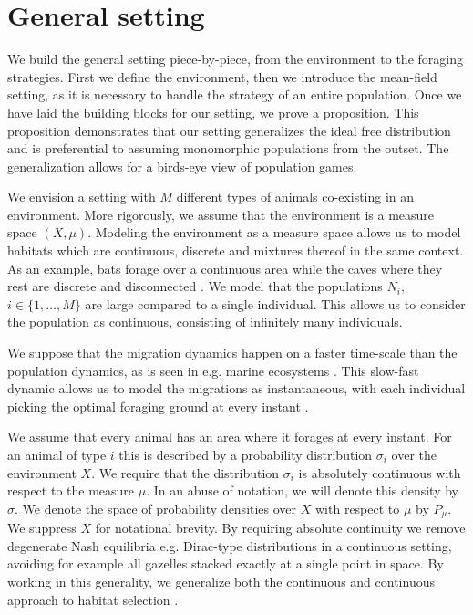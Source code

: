 \section{General setting}
\label{sec:general_setting}
We build the general setting piece-by-piece, from the environment to the foraging strategies. First we define the environment, then we introduce the mean-field setting, as it is necessary to handle the strategy of an entire population. Once we have laid the building blocks for our setting, we prove a proposition. This proposition demonstrates that our setting generalizes the ideal free distribution and is preferential to assuming monomorphic populations from the outset. The generalization allows for a birds-eye view of population games.

We envision a setting with $M$ different types of animals co-existing in an environment.  More rigorously, we assume that the environment is a measure space $(X,\mu)$. Modeling the environment as a measure space allows us to model habitats which are continuous, discrete and mixtures thereof in the same context. As an example, bats forage over a continuous area while the caves where they rest are discrete and disconnected \citep{collet2019algorithmic}. We model that the populations $N_i$, $i\in \{1,\dots,M\}$  are large compared to a single individual. This allows us to consider the population as continuous, consisting of infinitely many individuals. %


We suppose that the migration dynamics happen on a faster time-scale than the population dynamics, as is seen in e.g. marine ecosystems \citep{iwasa1982vertical}. This slow-fast dynamic allows us to model the migrations as instantaneous, with each individual picking the optimal foraging ground at every instant \citep{kvrivan2013behavioral, cressman2006migration}.


We assume that every animal has an area where it forages at every instant. For an animal of type $i$ this is described by a probability distribution $\sigma_i$ over the environment $X$. We require that the distribution $\sigma_i$ is absolutely continuous with respect to the measure $\mu$. In an abuse of notation, we will denote this density by $\sigma$. We denote the space of probability densities over $X$ with respect to $\mu$ by $P_{\mu}$. We suppress $X$ for notational brevity. By requiring absolute continuity we remove degenerate Nash equilibria e.g. Dirac-type distributions in a continuous setting, avoiding for example all gazelles stacked exactly at a single point in space. By working in this generality, we generalize both the continuous and continuous approach to habitat selection \citep{fretwell1969territorial, broom2013game, verticalmigration}.


